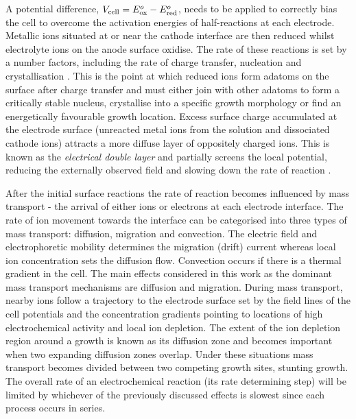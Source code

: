 \documentclass{article}
\begin{document}
A potential difference, $V_{\mathrm{cell}} = E^o_{\mathrm{ox}}-E^o_{\mathrm{red}}$, needs to be applied to correctly bias the cell to overcome the activation energies of half-reactions at each electrode. Metallic ions situated at or near the cathode interface are then reduced whilst electrolyte ions on the anode surface oxidise. The rate of these reactions is set by a number factors, including the rate of charge transfer, nucleation and crystallisation \cite{paunovic2006fundamentals}. This is the point at which reduced ions form adatoms on the surface after charge transfer and must either join with other adatoms to form a critically stable nucleus, crystallise into a specific growth morphology or find an energetically favourable growth location. Excess surface charge accumulated at the electrode surface (unreacted metal ions from the solution and dissociated cathode ions) attracts a more diffuse layer of oppositely charged ions. This is known as the \textit{electrical double layer} and partially screens the local potential, reducing the externally observed field and slowing down the rate of reaction \cite{bard2001electrochemical}.

After the initial surface reactions the rate of reaction becomes influenced by mass transport - the arrival of either ions or electrons at each electrode interface. The rate of ion movement towards the interface can be categorised into three types of mass transport: diffusion, migration and convection. The electric field and electrophoretic mobility determines the migration (drift) current whereas local ion concentration sets the diffusion flow. Convection occurs if there is a thermal gradient in the cell. The main effects considered in this work as the dominant mass transport mechanisms are diffusion and migration.
During mass transport, nearby ions follow a trajectory to the electrode surface set by the field lines of the cell potentials and the concentration gradients pointing to locations of high electrochemical activity and local ion depletion. The extent of the ion depletion region around a growth is known as its diffusion zone and becomes important when two expanding diffusion zones overlap. Under these situations mass transport becomes divided between two competing growth sites, stunting growth. The overall rate of an electrochemical reaction (its rate determining step) will be limited by whichever of the previously discussed effects is slowest since each process occurs in series.
\end{document}
